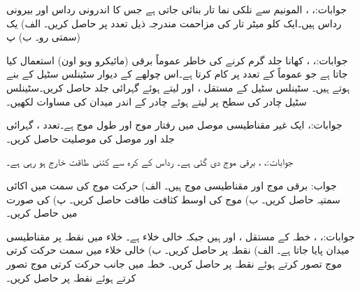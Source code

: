 جوابات:، ، 
المونیم  سے نلکی نما تار بنائی جاتی ہے جس کا اندرونی رداس  اور بیرونی رداس  ہیں۔ایک کلو میٹر تار کی مزاحمت مندرجہ ذیل تعدد پر حاصل کریں۔ الف) یک سمتی رو۔ ب) پ) 

جوابات:، ، 
کھانا جلد گرم کرنے کی خاطر عموماً برقی  (مائیکرو ویو اون)  استعمال کیا جاتا ہے جو عموماً  کے تعدد پر کام کرتا ہے۔اس چولھے کے دیوار سٹینلس سٹیل کے بنے ہوتے ہیں۔ سٹینلس سٹیل کے مستقل ،  اور  لیتے ہوئے گہرائی جلد  حاصل کریں۔سٹینلس سٹیل چادر کی سطح پر
  لیتے ہوئے چادر کے اندر میدان کی مساوات لکھیں۔

جوابات:،    
ایک غیر مقناطیسی موصل میں رفتار موج  اور طول موج  ہے۔تعدد ، گہرائی جلد   اور موصل کی موصلیت  حاصل کریں۔

جوابات:، ،   
برقی موج  دی گئی ہے۔ رداس  کے کرہ سے کتنی طاقت خارج ہو رہی ہے۔

جواب:
برقی موج  اور مقناطیسی موج
  ہیں۔ الف) حرکت موج کی سمت میں اکائی سمتیہ حاصل کریں۔ ب) موج کی اوسط کثافت طاقت حاصل کریں۔ پ)  کی صورت میں  حاصل کریں۔

جوابات:، ، 
خطہ  کے مستقل ،  اور  ہیں  جبکہ  خالی خلاء ہے۔ خلاء میں نقطہ  پر مقناطیسی میدان  پایا جاتا ہے۔ الف) نقطہ  پر  حاصل کریں۔ ب) خالی خلاء میں  سمت حرکت کرتی موج تصور کرتے ہوئے  نقطہ  پر
  حاصل کریں۔ خطہ  میں  جانب حرکت کرتی موج تصور کرتے ہوئے  نقطہ  پر  حاصل کریں۔

